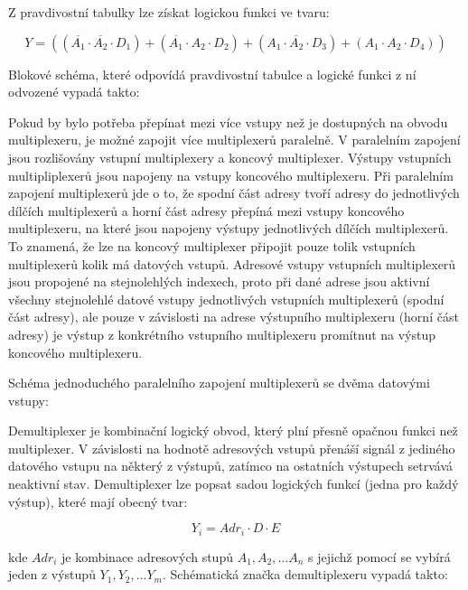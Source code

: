 Z pravdivostní tabulky lze získat logickou funkci ve tvaru:

$$ Y = ((\overline{A_1}\cdot\overline {A_2} \cdot D_1) + (\overline{A_1}\cdot A_2 \cdot D_2) + (A_1 \cdot \overline {A_2}\cdot D_3)+(A_1 \cdot A_2 \cdot D_4)) $$

Blokové schéma, které odpovídá pravdivostní tabulce a logické funkci z ní odvozené vypadá takto:

\vskip 4mm
\centerline{}
\vskip 4mm


Pokud by bylo potřeba přepínat mezi více vstupy než je dostupných na obvodu multiplexeru, je možné zapojit více multiplexerů paralelně. V paralelním zapojení jsou rozlišovány vstupní multiplexery a koncový multiplexer. Výstupy vstupních multipliplexerů jsou napojeny na vstupy koncového multiplexeru. Při paralelním zapojení multiplexerů jde o to, že spodní část adresy tvoří adresy do jednotlivých dílčích multiplexerů a horní část adresy přepíná mezi vstupy koncového multiplexeru, na které jsou napojeny výstupy jednotlivých dílčích multiplexerů. To znamená, že lze na koncový multiplexer připojit pouze tolik vstupních multiplexerů kolik má datových vstupů. Adresové vstupy vstupních multiplexerů jsou propojené na stejnolehlých indexech, proto při dané adrese jsou aktivní všechny stejnolehlé datové vstupy jednotlivých vstupních multiplexerů (spodní část adresy), ale pouze v závislosti na adrese výstupního multiplexeru (horní část adresy) je výstup z konkrétního vstupního multiplexeru promítnut na výstup koncového multiplexeru.

Schéma jednoduchého paralelního zapojení multiplexerů se dvěma datovými vstupy:

\vskip 4mm
\centerline{}
\vskip 4mm



Demultiplexer je kombinační logický obvod, který plní přesně opačnou funkci než multiplexer. V závislosti na hodnotě adresových vstupů přenáší signál z jediného datového vstupu na některý z výstupů, zatímco na ostatních výstupech setrvává neaktivní stav. Demultiplexer lze popsat sadou logických funkcí (jedna pro každý výstup), které mají obecný tvar:

$$ Y_i = Adr_i \cdot D \cdot E $$

kde $Adr_i$ je kombinace adresových stupů $A_1, A_2, … A_n$ s jejichž pomocí se vybírá jeden z výstupů $Y_1, Y_2, ...Y_m$. Schématická značka demultiplexeru vypadá takto:


